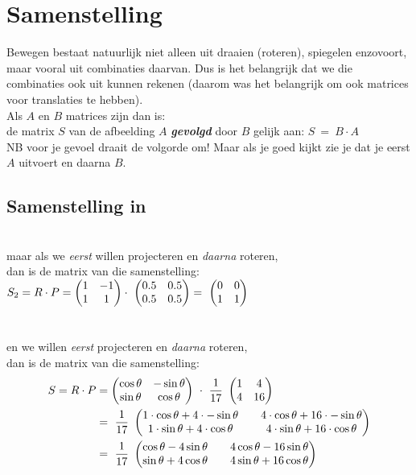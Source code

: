 \section{Samenstelling}		
Bewegen bestaat natuurlijk niet alleen uit draaien (roteren), spiegelen enzovoort, maar vooral uit combinaties daarvan. Dus is het belangrijk dat we die combinaties ook uit kunnen rekenen (daarom was het belangrijk om ook matrices voor translaties te hebben). \\ 
{Als $ A $ en $ B $  matrices zijn dan is:\\
	de matrix $S$ van de afbeelding $A$ \textit{\textbf{gevolgd}} door $B$ gelijk aan:
	\quad $ S\ = \ B \cdot A $ \\ NB voor je gevoel draait de volgorde om! Maar als je goed kijkt zie je dat je eerst $A$ uitvoert en daarna $B$.}
\subsection{Samenstelling in \RT}
 \\
maar als we \textit{eerst} willen  projecteren en \textit{daarna}  roteren, \\ dan is de matrix van die samenstelling:\\
$  S_2 = R\cdot P
= \begin{pmatrix}  1 & -1  \\  1 & 1  \end{pmatrix} \cdot 
\ \begin{pmatrix}  0.5 & 0.5  \\  0.5 & 0.5  \end{pmatrix} 
= \ \begin{pmatrix}  0 & 0  \\  1 & 1  \end{pmatrix}
$ \\ \\ \\
en we willen \textit{eerst} projecteren  en \textit{daarna} roteren, \\
dan is de matrix van die samenstelling: 
\begin{align*} 
S = R\cdot P 
&=	  \mattwee { \cos \theta & -\sin \theta }
{ \sin \theta & \cos \theta}  \ \cdot  \ 
\frac{1}{17} \  \mattwee { 1 & 4 }
{ 4  & 16 }  \\
& = \   \frac{1}{17} \  
\mattwee { 1\cdot \cos \theta + 4\cdot -\sin \theta  & & 4\cdot \cos \theta + 16\cdot -\sin \theta  }
{ 1\cdot \sin \theta + 4\cdot \cos \theta &  &4\cdot \sin \theta + 16\cdot \cos \theta}  \\  
& = \   \frac{1}{17} \  
\mattwee { \cos \theta - 4\sin \theta  & & 4\cos \theta - 16\sin \theta  }
{ \sin \theta + 4\cos \theta & & 4\sin \theta + 16\cos \theta}                                                
\end{align*} 

